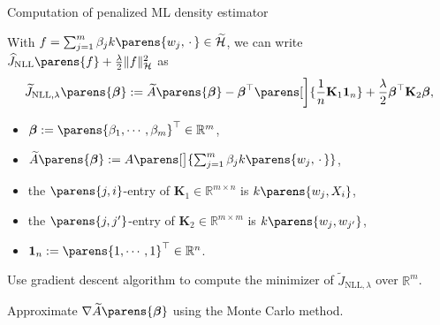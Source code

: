 \documentclass[aspectratio=169,xcolor=dvipsnames]{beamer}
\newcommand{\NLL}{\mathrm{NLL}}
\newcommand{\calH}{\mathcal{H}}
\newcommand{\bbeta}{\boldsymbol{\beta}}
\newcommand{\bK}{\mathbf{K}}
\begin{document}
\begin{frame}{Computation of penalized ML density estimator}
	
	
	With $f = \sum_{j=1}^m \beta_j k \parens{w_j, \,\cdot\,} \in \widetilde{\calH}$, we can write $\widehat{J}_{\NLL} \parens{f} + \frac{\lambda}{2} \Vert f \Vert_{\mathcal{H}}^2$ as 
	\begin{align}
		\widetilde{J}_{\NLL, \lambda} \parens{\bbeta} := \widetilde{A} \parens{\bbeta} - \bbeta^\top \parens[\bigg]{\frac{1}{n} \bK_1 \mathbf{1}_n} + \frac{\lambda}{2} \bbeta^\top \bK_2 \bbeta, 
	\end{align}
	\vspace{-10pt}
	\begin{itemize}
		\item $\bbeta := \parens{\beta_1, \cdots, \beta_m}^\top \in \mathbb{R}^m$, 
		\item $\widetilde{A} \parens{\bbeta} := A \parens[\big]{\sum_{j=1}^m \beta_j k \parens{w_j, \,\cdot\,}}$, 
		\item the $\parens{j, i}$-entry of $\bK_1 \in \mathbb{R}^{m \times n}$ is $k \parens{w_j, X_i}$, %
		\item the $\parens{j, j'}$-entry of $\bK_2 \in \mathbb{R}^{m \times m}$ is $k \parens{w_{j}, w_{j'}}$, %
		\item $\mathbf{1}_n := \parens{1, \cdots, 1}^\top \in \mathbb{R}^n$. 
	\end{itemize}
	
	\vspace{10pt}
	
	Use gradient descent algorithm to compute the minimizer of $\widetilde{J}_{\NLL, \lambda}$ over $\mathbb{R}^m$. 
	
	Approximate $\nabla \widetilde{A} \parens{\bbeta}$ using the Monte Carlo method. 
	
\end{frame}
\end{document}
